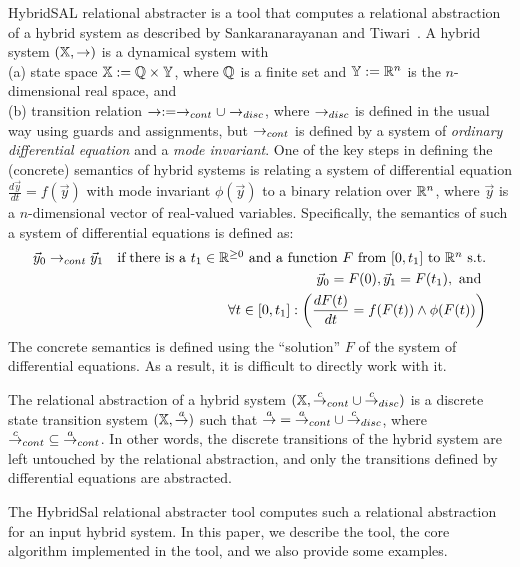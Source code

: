 \documentclass{llncs}
\begin{document}
HybridSAL relational abstracter is a tool that computes a relational
abstraction of a hybrid system as described by
Sankaranarayanan and Tiwari~\cite{ST11:CAVsmall}.
A hybrid system $(\mathbb{X}, \rightarrow)$ is a dynamical system with 
\\
(a) state space $\mathbb{X} := \mathbb{Q}\times\mathbb{Y}$, where $\mathbb{Q}$ is a finite set and
$\mathbb{Y} := \mathbb{R}^n$ is the $n$-dimensional real space,
and 
\\
(b)
transition relation $\rightarrow := \rightarrow_{cont}\cup\rightarrow_{disc}$, where
$\rightarrow_{disc}$ is defined in the usual way using guards and
assignments, but $\rightarrow_{cont}$ is defined by a system of
{\em{ordinary differential equation}} and a {\em{mode invariant}}.
One of the key steps in defining the (concrete)
semantics of hybrid systems
is relating a system of differential equation
$\frac{d\vec{y}}{dt} = f(\vec{y})$ with mode invariant
$\phi(\vec{y})$ to a binary relation 
over $\mathbb{R}^n$, where $\vec{y}$ is a $n$-dimensional vector of
real-valued variables.  Specifically, the semantics of
such a system of differential equations is defined as:
\begin{eqnarray}
\vec{y}_0 \ra_{cont} \vec{y}_1 & &
\mbox{if}\;
\mbox{there is a $t_1\in\RR^{\geq 0}$ and 
a function $F$ from $[0,t_1]$ to $\RR^n$ s.t.} \nonumber %
\\ & &
\vec{y}_0 = F(0),
\vec{y}_1 = F(t_1), \mbox{ and } \nonumber
\\ & &
\forall{t\in [0,t_1]}:
\left(\frac{dF(t)}{dt} = f(F(t)) \wedge \phi(F(t))\right)\label{eqn:sem}
%
\end{eqnarray}
The concrete semantics is defined using the ``solution''
$F$ of the system of differential equations.  As a result,
it is difficult to directly work with it.

The relational abstraction of a hybrid system 
$(\mathbb{X}, {\stackrel{c}{\rightarrow}}_{cont}\cup{\stackrel{c}{\rightarrow}}_{disc})$ 
is a discrete state transition system $(\mathbb{X}, {\stackrel{a}{\rightarrow}})$ such that
${\stackrel{a}{\rightarrow}} = {\stackrel{a}{\rightarrow}}_{cont}\cup{\stackrel{c}{\rightarrow}}_{disc}$, where 
${\stackrel{c}{\rightarrow}}_{cont} \subseteq {\stackrel{a}{\rightarrow}}_{cont}$.
In other words, the discrete transitions of the hybrid system
are left untouched by the relational abstraction, and only the
transitions defined by differential equations are abstracted.

The HybridSal relational abstracter tool computes such a relational
abstraction for an input hybrid system. 
In this paper, we describe the tool, the core algorithm implemented in the
tool, and we also provide some examples. %
\end{document}
